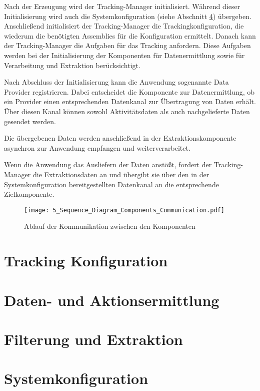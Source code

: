 Nach der Erzeugung wird der Tracking-Manager initialisiert. Während dieser Initialisierung wird auch die Systemkonfiguration (siehe Abschnitt \ref{sec:integration_concept}) übergeben. Anschließend initialisiert der Tracking-Manager die Trackingkonfiguration, die wiederum die benötigten Assemblies für die Konfiguration ermittelt. Danach kann der Tracking-Manager die Aufgaben für das Tracking anfordern. Diese Aufgaben werden bei der Initialisierung der Komponenten für Datenermittlung sowie für Verarbeitung und Extraktion berücksichtigt.

Nach Abschluss der Initialisierung kann die Anwendung sogenannte Data Provider registrieren. Dabei entscheidet die Komponente zur Datenermittlung, ob ein Provider einen entsprechenden Datenkanal zur Übertragung von Daten erhält. Über diesen Kanal können sowohl Aktivitätsdaten als auch nachgelieferte Daten gesendet werden.

Die übergebenen Daten werden anschließend in der Extraktionskomponente asynchron zur Anwendung empfangen und weiterverarbeitet.  

Wenn die Anwendung das Ausliefern der Daten anstößt, fordert der Tracking-Manager die Extraktionsdaten an und übergibt sie über den in der Systemkonfiguration bereitgestellten Datenkanal an die entsprechende Zielkomponente.

\begin{figure}[H]
    \centering
    \texttt{[image: 5\_Sequence\_Diagram\_Components\_Communication.pdf]}
    \caption{Ablauf der Kommunikation zwischen den Komponenten}
    \label{fig:sequence_diagram_communication_components}
\end{figure}

\section{Tracking Konfiguration}
\label{sec:configuration_concept}

\section{Daten- und Aktionsermittlung}
\label{sec:data_collection_concept}

\section{Filterung und Extraktion}
\label{sec:data_extraction_concept}

\section{Systemkonfiguration}
\label{sec:integration_concept}


